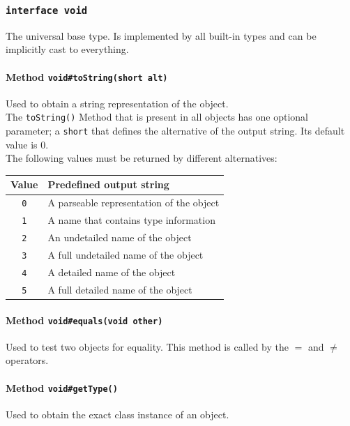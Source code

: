 \documentclass{docs}
\begin{document}
    \label{typeVoid}
    \subsubsection{\texttt{interface void}}
    The universal base type. Is implemented by all built-in types and can be implicitly cast to everything.

    \paragraph{Method \texttt{void\#toString(short alt)}}
    Used to obtain a string representation of the object.
    \\
    The \texttt{toString()} Method that is present in all objects has one optional parameter; a \texttt{short} that defines the alternative of the output string. Its default value is 0.
    \\
    The following values must be returned by different alternatives:
    \begin{center}
    \begin{tabular}{c|l}
        Value & Predefined output string \\
        \hline
        \texttt{0} & A parseable representation of the object \\
        \texttt{1} & A name that contains type information \\
        \texttt{2} & An undetailed name of the object \\
        \texttt{3} & A full undetailed name of the object \\
        \texttt{4} & A detailed name of the object \\
        \texttt{5} & A full detailed name of the object
    \end{tabular}
    \end{center}

    \paragraph{Method \texttt{void\#equals(void other)}}
    Used to test two objects for equality.
    This method is called by the \begin{math}=\end{math} and \begin{math}\neq\end{math} operators.

    \paragraph{Method \texttt{void\#getType()}}
    Used to obtain the exact class instance of an object.
\end{document}
